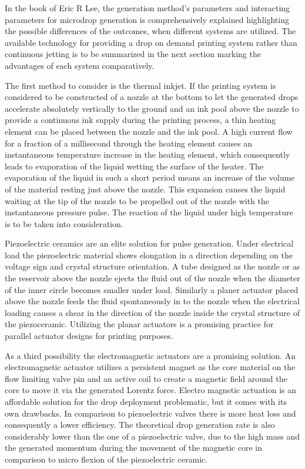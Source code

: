 In the book of Eric R Lee, the generation method's parameters and interacting parameters for microdrop generation is comprehensively explained highlighting the possible differences of the outcomes, when different systems are utilized. The available technology for providing a drop on demand printing system rather than continuous jetting is to be summarized in the next section marking the advantages of each system comparatively.  

The first method to consider is the thermal inkjet.  If the printing system is considered to be constructed of a nozzle at the bottom to let the generated drops accelerate absolutely vertically to the ground and an ink pool above the nozzle to provide a continuous ink supply during the printing process, a thin heating element can be placed between the nozzle and the ink pool. A high current flow for a fraction of a millisecond through the heating element causes an instantaneous temperature increase in the heating element, which consequently leads to evaporation of the liquid wetting the surface of the heater. The evaporation of the liquid in such a short period means an increase of the volume of the material resting just above the nozzle. This expansion causes the liquid waiting at the tip of the nozzle to be propelled out of the nozzle with the instantaneous pressure pulse. The reaction of the liquid under high temperature is to be taken into consideration.

Piezoelectric ceramics are an elite solution for pulse generation. Under electrical load the piezoelectric material shows elongation in a direction depending on the voltage sign and crystal structure orientation. A tube designed as the nozzle or as the reservoir above the nozzle ejects the fluid out of the nozzle when the diameter of the inner circle becomes smaller under load. Similarly a planer actuator placed above the nozzle feeds the fluid spontaneously in to the nozzle when the electrical loading causes a shear in the direction of the nozzle inside the crystal structure of the piezoceramic. Utilizing the planar actuators is a promising practice for parallel actuator designs for printing purposes.\citep{lee2002microdrop}

As a third possibility the electromagnetic actuators are a promising solution. An electromagnetic actuator utilizes a persistent magnet as the core material on the flow limiting valve pin and an active coil to create a magnetic field around the core to move it via the generated Lorentz force. Electro magnetic actuation is an affordable solution for the drop deployment problematic, but it comes with its own drawbacks. In comparison to piezoelectric valves there is more heat loss and consequently a lower efficiency. The theoretical drop generation rate is also considerably lower than the one of a piezoelectric valve, due to the high mass and the generated momentum during the movement of the magnetic core in comparison to micro flexion of the piezoelectric ceramic.\citep{nguyen2002fundamentals}


